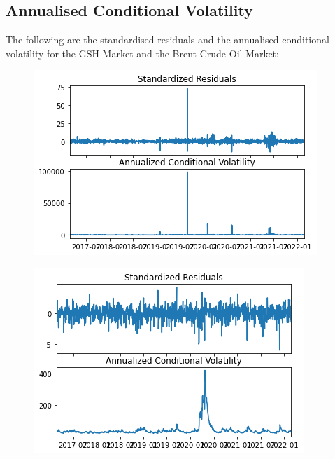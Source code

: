 \subsection{Annualised Conditional Volatility}
The following are the standardised residuals and the annualised conditional volatility for the GSH Market and the Brent Crude Oil Market:
\begin{figure}[H]
\centering
\begin{minipage}{.5\textwidth}
  \centering
  \includegraphics[width=1.0\linewidth]{Figures/Garch/gas_annualised.png}
  \label{fig:test1}
\end{minipage}%
\begin{minipage}{.5\textwidth}
  \centering
  \includegraphics[width=1.0\linewidth]{Figures/Garch/crude_annualised.png}
  \label{fig:test2}
\end{minipage}
\end{figure}

